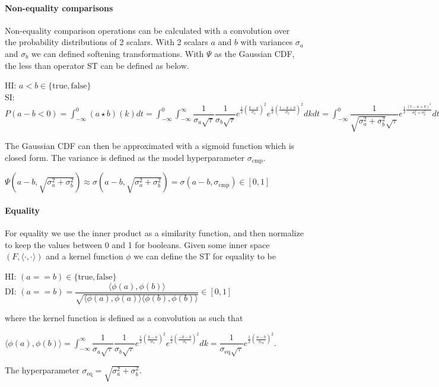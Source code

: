\documentclass{article}
\begin{document}
\paragraph{Non-equality comparisons} Non-equality comparison operations can be calculated with a convolution over the probability distributions of 2 scalars. With 2 scalars $a$ and $b$ with variances $\sigma_a$ and $\sigma_b$ we can defined softening transformations. With $\Psi$ as the Gaussian CDF, the less than operator ST can be defined as below.

\begin{center}
  HI: $a < b \in \{\text{true}, \text{false}\}$\\
  SI: $P(a - b < 0) = \int_{-\infty}^0 (a \star b) (k) dt = \int_{-\infty}^0 \int_{-\infty}^{\infty} \dfrac{1}{\sigma_a \sqrt{\tau}} \dfrac{1}{\sigma_b \sqrt{\tau}} e^{\frac{1}{2}(\frac{k - a}{\sigma_a})^2}e^{\frac{1}{2}(\frac{t-k + b}{\sigma_b})^2} dk dt = \int_{-\infty}^0 \dfrac{1}{\sqrt{\sigma_a^2 + \sigma_b^2} \sqrt{\tau}} e^{\frac{1}{2}\frac{(t - a + b)^2}{\sigma_a^2 + \sigma_b^2}}dt = \Psi(a - b, \sqrt{\sigma_a^2 + \sigma_b^2}) \in [0, 1]$
\end{center}
The Gaussian CDF can then be approximated with a sigmoid function which is closed form. The variance is defined as the model hyperparameter $\sigma_{\text{cmp}}$.
\begin{center}
  $\Psi(a - b, \sqrt{\sigma_a^2 + \sigma_b^2}) \approx \sigma(a - b, \sqrt{\sigma_a^2 + \sigma_b^2}) = \sigma(a - b, \sigma_{\text{cmp}}) \in [0, 1]$
\end{center}
\paragraph{Equality} For equality we use the inner product as a similarity function, and then normalize to keep the values between 0 and 1 for booleans. Given some inner space $(F, \langle \cdot, \cdot \rangle)$ and a kernel function $\phi$ we can define the ST for equality to be
\begin{center}
  HI: $(a == b) \in \{\text{true}, \text{false}\}$\\
  DI: $(a == b) = \dfrac{\langle \phi(a), \phi(b) \rangle}{\sqrt{\langle \phi(a), \phi(a) \rangle \langle \phi(b), \phi(b) \rangle}} \in [0, 1]$
\end{center}
where the kernel function is defined as a convolution as such that
\begin{center}
  $\langle \phi(a), \phi(b) \rangle = \int_{-\infty}^{\infty} \dfrac{1}{\sigma_a \sqrt{\tau}} \dfrac{1}{\sigma_b \sqrt{\tau}} e^{\frac{1}{2}(\frac{k - a}{\sigma_a})^2}e^{\frac{1}{2}(\frac{-k - b}{\sigma_b})^2} dk = \dfrac{1}{\sigma_{\text{eq}} \sqrt{\tau}} e^{\frac{1}{2}(\frac{a - b}{\sigma_{\text{eq}}})^2}$.
\end{center}
The hyperparameter $\sigma_{\text{eq}} = \sqrt{\sigma_a^2 + \sigma_b^2}$.
\end{document}
